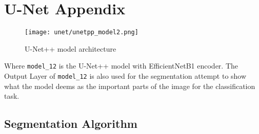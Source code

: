 \section{U-Net Appendix}\label{s:unetAppendix}

\begin{figure}[H]
  \begin{center}
    \texttt{[image: unet/unetpp\_model2.png]}
  \end{center}
  \caption{U-Net++ model architecture}\label{fig:unetpp_model}
\end{figure}

Where \texttt{model\_12} is the U-Net++ model with EfficientNetB1 encoder. The Output Layer of \texttt{model\_12} is also used for the segmentation attempt to show what the model deems as the important parts of the image for the classification task.

\subsection{Segmentation Algorithm}\label{ss:segmentationAlgorithm}

